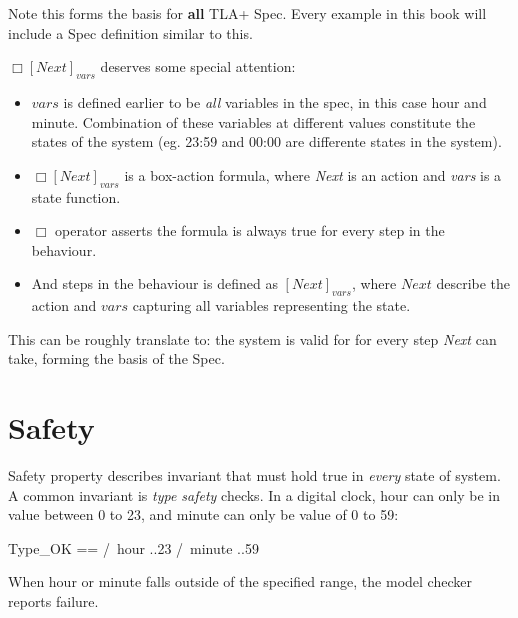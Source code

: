 Note this forms the basis for \textbf{all} TLA+ Spec. Every example in this book
will include a Spec definition similar to this. \newline

$\Box[Next]_{vars}$ deserves some special attention:
\begin{itemize}
    \item $vars$ is defined earlier to be \textit{all} variables in the spec, in
    this case hour and minute. Combination of these variables at different
    values constitute the states of the system (eg. 23:59 and 00:00 are differente
    states in the system).
    \item $\Box[Next]_{vars}$ is a box-action formula, where \textit{Next} is an
    action and \textit{vars} is a state function.
    \item $\Box$ operator asserts the formula is always true for every step in the behaviour.
    \item And steps in the behaviour is defined as $[Next]_{vars}$, where $Next$
    describe the action and $vars$ capturing all variables representing the state.
\end{itemize}

This can be roughly translate to: the system is valid for for every step
\textit{Next} can take, forming the basis of the Spec.

\section{Safety}

Safety property describes invariant that must hold true in \textit{every} state
of system. A common invariant is \textit{type safety} checks. In a digital
clock, hour can only be in value between 0 to 23, and minute can only be value
of 0 to 59:\newline

\begin{tla}
    Type_OK == 
        /\ hour ..23
        /\ minute ..59
\end{tla}
\begin{tlatex}
%
%
%
\end{tlatex}
\newline

When hour or minute falls outside of the specified range, the model checker 
reports failure.

